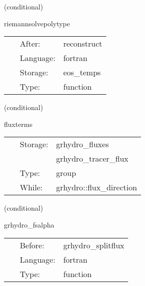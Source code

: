 \documentclass{article}
\begin{document}
\vspace{5mm}

   (conditional) 

\hspace{5mm} riemannsolvepolytype 

\hspace{5mm}{\it solve the local riemann problems } 


\hspace{5mm}

 \begin{tabular*}{160mm}{cll} 
~ & After:  & reconstruct \\ 
~ & Language:  & fortran \\ 
~ & Storage:  & eos\_temps \\ 
~ & Type:  & function \\ 
\end{tabular*} 


\vspace{5mm}

   (conditional) 

\hspace{5mm} fluxterms 

\hspace{5mm}{\it calculation of intercell fluxes } 


\hspace{5mm}

 \begin{tabular*}{160mm}{cll} 
~ & Storage:  & grhydro\_fluxes \\ 
~& ~ &grhydro\_tracer\_flux\\ 
~ & Type:  & group \\ 
~ & While:  & grhydro::flux\_direction \\ 
\end{tabular*} 


\vspace{5mm}

   (conditional) 

\hspace{5mm} grhydro\_fsalpha 

\hspace{5mm}{\it compute the maximum characteristic speeds } 


\hspace{5mm}

 \begin{tabular*}{160mm}{cll} 
~ & Before:  & grhydro\_splitflux \\ 
~ & Language:  & fortran \\ 
~ & Type:  & function \\ 
\end{tabular*} 
\end{document}
